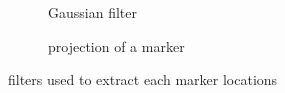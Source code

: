 \begin{figure}
	\centering
	\begin{subfigure}[b]{0.3\linewidth}
	\centering
	\label{fig:GaussianFilter}
	\caption{Gaussian filter}
	\end{subfigure}
\hspace{0.2cm}
	\begin{subfigure}[b]{0.3\linewidth}
	\centering
	\label{fig:markercluster}
	\caption{projection of a marker}
	\end{subfigure}
\label{fig:extractmarkerlocation}
\caption{filters used to extract each marker locations}
\end{figure}

